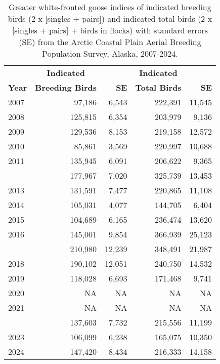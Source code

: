\documentclass[
]{article}
\begin{document}
\begingroup\fontsize{10}{12}\selectfont

\begin{longtable}[t]{lrrrr}

\caption{\label{tbl-GWFG}Greater white-fronted goose indices of
indicated breeding birds (2 x {[}singles + pairs{]}) and indicated total
birds (2 x {[}singles + pairs{]} + birds in flocks) with standard errors
(SE) from the Arctic Coastal Plain Aerial Breeding Population Survey,
Alaska, 2007-2024.}

\tabularnewline

\\
\toprule
\multicolumn{1}{c}{\textbf{ }} & \multicolumn{1}{c}{\textbf{Indicated}} & \multicolumn{1}{c}{\textbf{ }} & \multicolumn{1}{c}{\textbf{Indicated}} & \multicolumn{1}{c}{\textbf{ }} \\
\cmidrule(l{3pt}r{3pt}){2-2} \cmidrule(l{3pt}r{3pt}){4-4}
\textbf{Year} & \textbf{Breeding Birds} & \textbf{SE} & \textbf{Total Birds} & \textbf{SE}\\
\midrule
2007 & 97,186 & 6,543 & 222,391 & 11,545\\
2008 & 125,815 & 6,354 & 203,979 & 9,136\\
2009 & 129,536 & 8,153 & 219,158 & 12,572\\
2010 & 85,861 & 3,569 & 220,997 & 10,688\\
2011 & 135,945 & 6,091 & 206,622 & 9,365\\
\addlinespace
2012 & 177,967 & 7,020 & 325,739 & 13,453\\
2013 & 131,591 & 7,477 & 220,865 & 11,108\\
2014 & 105,031 & 4,077 & 144,705 & 6,404\\
2015 & 104,689 & 6,165 & 236,474 & 13,620\\
2016 & 145,001 & 9,854 & 366,939 & 25,123\\
\addlinespace
2017 & 210,980 & 12,239 & 348,491 & 21,987\\
2018 & 190,102 & 12,051 & 240,750 & 14,532\\
2019 & 118,028 & 6,693 & 171,468 & 9,741\\
2020 & NA & NA & NA & NA\\
2021 & NA & NA & NA & NA\\
\addlinespace
2022 & 137,603 & 7,732 & 215,556 & 11,199\\
2023 & 106,099 & 6,238 & 165,075 & 10,350\\
2024 & 147,420 & 8,434 & 216,333 & 14,158\\
\bottomrule

\end{longtable}
\end{document}
